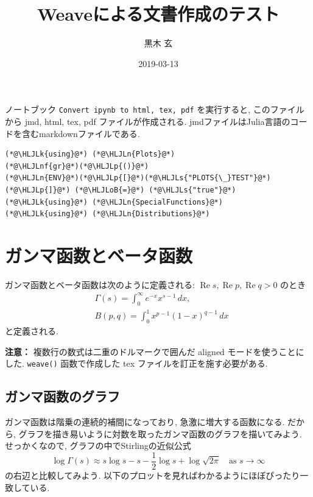\documentclass[12pt,a4paper,xelatex,ja=standard]{bxjsarticle}
\title{\bfseries Weaveによる文書作成のテスト }
\author{ 黒木 玄 }
\date{ 2019-03-13 }
\newcommand{\HLJLk}[1]{\textcolor[RGB]{148,91,176}{\textbf{#1}}}
\newcommand{\HLJLn}[1]{#1}
\newcommand{\HLJLnf}[1]{\textcolor[RGB]{66,102,213}{#1}}
\newcommand{\HLJLs}[1]{\textcolor[RGB]{201,61,57}{#1}}
\newcommand{\HLJLoB}[1]{\textcolor[RGB]{102,102,102}{\textbf{#1}}}
\newcommand{\HLJLp}[1]{#1}
\newcommand\real{\operatorname{Re}}
\begin{document}
\maketitle

\tableofcontents

ノートブック \texttt{Convert ipynb to html, tex, pdf} を実行すると, このファイルから jmd, html, tex, pdf ファイルが作成される.  jmdファイルはJulia言語のコードを含むmarkdownファイルである.


\begin{lstlisting}
(*@\HLJLk{using}@*) (*@\HLJLn{Plots}@*)
(*@\HLJLnf{gr}@*)(*@\HLJLp{()}@*)
(*@\HLJLn{ENV}@*)(*@\HLJLp{[}@*)(*@\HLJLs{"PLOTS{\_}TEST"}@*)(*@\HLJLp{]}@*) (*@\HLJLoB{=}@*) (*@\HLJLs{"true"}@*)
(*@\HLJLk{using}@*) (*@\HLJLn{SpecialFunctions}@*)
(*@\HLJLk{using}@*) (*@\HLJLn{Distributions}@*)
\end{lstlisting}


\section{ガンマ函数とベータ函数}
ガンマ函数とベータ函数は次のように定義される: $\real s, \real p, \real q > 0$ のとき
\[
\begin{aligned}
&
\Gamma(s) = \int_0^\infty e^{-x} x^{s-1}\,dx,
\\ &
B(p,q) = \int_0^1 x^{p-1} (1-x)^{q-1}\,dx
\end{aligned}
\]
と定義される. 

\textbf{注意：} 複数行の数式は二重のドルマークで囲んだ aligned モードを使うことにした. \texttt{weave()} 函数で作成した tex ファイルを訂正を施す必要がある.

\subsection{ガンマ函数のグラフ}
ガンマ函数は階乗の連続的補間になっており, 急激に増大する函数になる. だから, グラフを描き易いように対数を取ったガンマ函数のグラフを描いてみよう. せっかくなので, グラフの中でStirlingの近似公式
\[
\log\Gamma(s) \approx s \log s - s - \frac{1}{2}\log s + \log\sqrt{2\pi}
\quad\text{as $s\to\infty$}
\]
の右辺と比較してみよう. 以下のプロットを見ればわかるようにほぼぴったり一致している.
\end{document}
